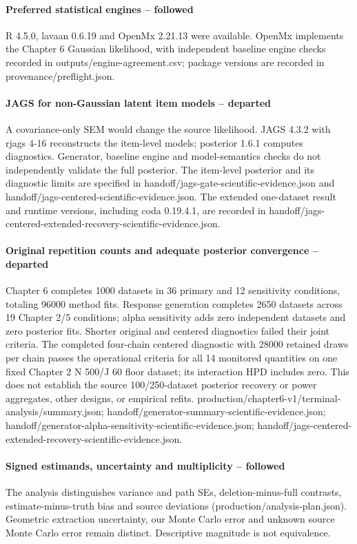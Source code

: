 \documentclass[11pt]{article}
\begin{document}
\paragraph{Preferred statistical engines -- followed}  R 4.5.0, lavaan 0.6.19 and OpenMx 2.21.13 were available. OpenMx implements the Chapter 6 Gaussian likelihood, with independent baseline engine checks recorded in outputs/engine-agreement.csv; package versions are recorded in provenance/preflight.json.
\paragraph{JAGS for non-Gaussian latent item models -- departed} A covariance-only SEM would change the source likelihood. JAGS 4.3.2 with rjags 4-16 reconstructs the item-level models; posterior 1.6.1 computes diagnostics. Generator, baseline engine and model-semantics checks do not independently validate the full posterior. The item-level posterior and its diagnostic limits are specified in handoff/jags-gate-scientific-evidence.json and handoff/jags-centered-scientific-evidence.json. The extended one-dataset result and runtime versions, including coda 0.19.4.1, are recorded in handoff/jags-centered-extended-recovery-scientific-evidence.json.
\paragraph{Original repetition counts and adequate posterior convergence -- departed} Chapter 6 completes 1000 datasets in 36 primary and 12 sensitivity conditions, totaling 96000 method fits. Response generation completes 2650 datasets across 19 Chapter 2/5 conditions; alpha sensitivity adds zero independent datasets and zero posterior fits. Shorter original and centered diagnostics failed their joint criteria. The completed four-chain centered diagnostic with 28000 retained draws per chain passes the operational criteria for all 14 monitored quantities on one fixed Chapter 2 N 500/J 60 floor dataset; its interaction HPD includes zero. This does not establish the source 100/250-dataset posterior recovery or power aggregates, other designs, or empirical refits. production/chapter6-v1/terminal-analysis/summary.json; handoff/generator-summary-scientific-evidence.json; handoff/generator-alpha-sensitivity-scientific-evidence.json; handoff/jags-centered-extended-recovery-scientific-evidence.json.
\paragraph{Signed estimands, uncertainty and multiplicity -- followed}  The analysis distinguishes variance and path SEs, deletion-minus-full contrasts, estimate-minus-truth bias and source deviations (production/analysis-plan.json). Geometric extraction uncertainty, our Monte Carlo error and unknown source Monte Carlo error remain distinct. Descriptive magnitude is not equivalence.
\end{document}
